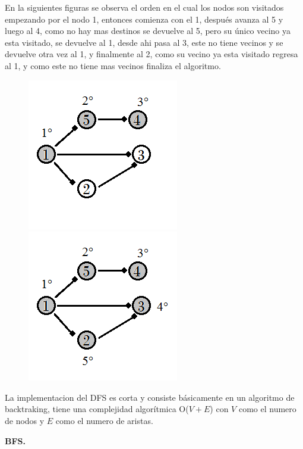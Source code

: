 \documentclass[12pt, a4paper]{article}
\newcommand\cppfile[2][]{

}
\newcommand{\subtitulo}[1]{\begin{center}\textbf{#1}\end{center}}
\begin{document}
	En la siguientes figuras se observa el orden en el cual los nodos son visitados empezando por el nodo 1, 
	entonces comienza con el 1, después avanza al 5 y luego al 4, como no hay mas destinos se devuelve al 5,
	pero su único vecino ya esta visitado, se devuelve al 1, desde ahi pasa al 3, este no tiene vecinos y se
	devuelve otra vez al 1, y finalmente al 2, como su vecino ya esta visitado regresa al 1, y como este no tiene
	mas vecinos finaliza el algoritmo.
	
	\begin{figure}[!htb]
			\centering
			\includegraphics[scale=1]{Grafos/imagenes/DFS_y_BFS/DFS1}
			\caption{}
			\label{grafos:DFS_y_BFS:DFS1}
		\endminipage
			\centering
			\includegraphics[scale=1]{Grafos/imagenes/DFS_y_BFS/DFS2}
			\caption{}
			\label{grafos:DFS_y_BFS:DFS2}
		\endminipage
	\end{figure}	
	
	La implementacion del DFS es corta y consiste básicamente en un algoritmo de backtraking, tiene una complejidad
	algorítmica O($V+E$) con $V$ como el numero de nodos y $E$ como el numero de aristas.
	\cppfile[6-16]{Grafos/codigos/DFS.cpp}
	
	\subtitulo{BFS.}
	
\end{document}
